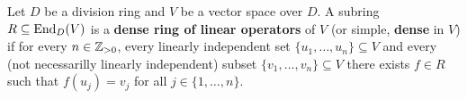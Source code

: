 %
%



\begin{definition}
	Let $D$ be a division ring and $V$ be a vector space over $D$. A subring 
	$R\subseteq\operatorname{End}_D(V)$ is a \textbf{dense ring of linear operators} 
	of $V$ (or simple, \textbf{dense} in $V$) if for every  
	$n\in\mathbb{Z}_{>0}$, every linearly independent set $\{u_1,\dots,u_n\}\subseteq V$ 
	and every (not necessarilly linearly independent) subset $\{v_1,\dots,v_n\}\subseteq V$ 
	there exists $f\in R$ such that $f(u_j)=v_j$ for all 
	$j\in\{1,\dots,n\}$.
\end{definition}

